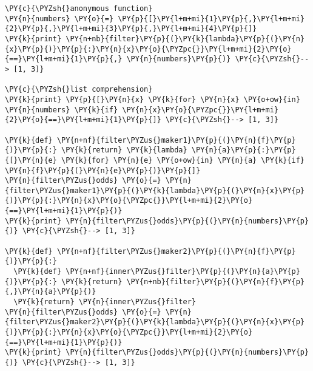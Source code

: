 \begin{Verbatim}[commandchars=\\\{\}]
\PY{c}{\PYZsh{}anonymous function}
\PY{n}{numbers} \PY{o}{=} \PY{p}{[}\PY{l+m+mi}{1}\PY{p}{,}\PY{l+m+mi}{2}\PY{p}{,}\PY{l+m+mi}{3}\PY{p}{,}\PY{l+m+mi}{4}\PY{p}{]}
\PY{k}{print} \PY{n+nb}{filter}\PY{p}{(}\PY{k}{lambda}\PY{p}{(}\PY{n}{x}\PY{p}{)}\PY{p}{:}\PY{n}{x}\PY{o}{\PYZpc{}}\PY{l+m+mi}{2}\PY{o}{==}\PY{l+m+mi}{1}\PY{p}{,} \PY{n}{numbers}\PY{p}{)} \PY{c}{\PYZsh{}--> [1, 3]}

\PY{c}{\PYZsh{}list comprehension}
\PY{k}{print} \PY{p}{[}\PY{n}{x} \PY{k}{for} \PY{n}{x} \PY{o+ow}{in} \PY{n}{numbers} \PY{k}{if} \PY{n}{x}\PY{o}{\PYZpc{}}\PY{l+m+mi}{2}\PY{o}{==}\PY{l+m+mi}{1}\PY{p}{]} \PY{c}{\PYZsh{}--> [1, 3]}

\PY{k}{def} \PY{n+nf}{filter\PYZus{}maker1}\PY{p}{(}\PY{n}{f}\PY{p}{)}\PY{p}{:} \PY{k}{return} \PY{k}{lambda} \PY{n}{a}\PY{p}{:}\PY{p}{[}\PY{n}{e} \PY{k}{for} \PY{n}{e} \PY{o+ow}{in} \PY{n}{a} \PY{k}{if} \PY{n}{f}\PY{p}{(}\PY{n}{e}\PY{p}{)}\PY{p}{]}
\PY{n}{filter\PYZus{}odds} \PY{o}{=} \PY{n}{filter\PYZus{}maker1}\PY{p}{(}\PY{k}{lambda}\PY{p}{(}\PY{n}{x}\PY{p}{)}\PY{p}{:}\PY{n}{x}\PY{o}{\PYZpc{}}\PY{l+m+mi}{2}\PY{o}{==}\PY{l+m+mi}{1}\PY{p}{)}
\PY{k}{print} \PY{n}{filter\PYZus{}odds}\PY{p}{(}\PY{n}{numbers}\PY{p}{)} \PY{c}{\PYZsh{}--> [1, 3]}

\PY{k}{def} \PY{n+nf}{filter\PYZus{}maker2}\PY{p}{(}\PY{n}{f}\PY{p}{)}\PY{p}{:}
  \PY{k}{def} \PY{n+nf}{inner\PYZus{}filter}\PY{p}{(}\PY{n}{a}\PY{p}{)}\PY{p}{:} \PY{k}{return} \PY{n+nb}{filter}\PY{p}{(}\PY{n}{f}\PY{p}{,}\PY{n}{a}\PY{p}{)}
  \PY{k}{return} \PY{n}{inner\PYZus{}filter}
\PY{n}{filter\PYZus{}odds} \PY{o}{=} \PY{n}{filter\PYZus{}maker2}\PY{p}{(}\PY{k}{lambda}\PY{p}{(}\PY{n}{x}\PY{p}{)}\PY{p}{:}\PY{n}{x}\PY{o}{\PYZpc{}}\PY{l+m+mi}{2}\PY{o}{==}\PY{l+m+mi}{1}\PY{p}{)}
\PY{k}{print} \PY{n}{filter\PYZus{}odds}\PY{p}{(}\PY{n}{numbers}\PY{p}{)} \PY{c}{\PYZsh{}--> [1, 3]}
\end{Verbatim}
